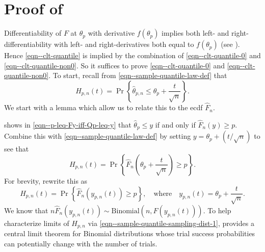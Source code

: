 
\section{Proof of
\texorpdfstring{}{Theorem
\ref{thm--clt-quantile}}}
\label{sec--prf--thm--clt-quantile}

Differentiability of \(F\) at \(\theta_{p}\) with derivative \(f \left(
\theta_{p} \right)\) implies both left- and right-differentiability with left-
and right-derivatives both equal to \(f \left( \theta_{p} \right)\) (see
).
Hence \eqref{eqn--clt-quantile} is
implied by the combination of \eqref{eqn--clt-quantile-0} and
\eqref{eqn--clt-quantile-non0}.
So it suffices to prove \eqref{eqn--clt-quantile-0} and
\eqref{eqn--clt-quantile-non0}.
To start, recall from \eqref{eqn--sample-quantile-law-def} that
\begin{equation*}
  H_{p, n} (t) = \Pr \left\{ \widehat{\theta}_{p, n} \leq \theta_{p} +
  \frac{t}{\sqrt{n}} \right\}.
\end{equation*}
We start with a lemma which allow us to relate this to the ecdf
\(\widehat{F}_{n}\).

 shows in \eqref{eqn--p-leq-Fy-iff-Qp-leq-y}
that \(\widehat{\theta}_{p} \leq y\) if and only if \(\widehat{F}_{n} (y) \geq
p\).
Combine this with \eqref{eqn--sample-quantile-law-def} by setting \(y =
\theta_{p} + (t / \sqrt{n})\) to see that
\begin{equation*}
  H_{p, n} (t) = \Pr \left\{ \widehat{F}_{n} \left( \theta_{p} +
  \frac{t}{\sqrt{n}} \right) \geq p \right\}.
\end{equation*}
For brevity, rewrite this as
\begin{equation}
  H_{p, n} (t) = \Pr \left\{ \widehat{F}_{n} \left( y_{p, n} (t) \right) \geq p
  \right\},
  \quad \text{where} \quad
  y_{p, n} (t) = \theta_{p} + \frac{t}{\sqrt{n}}.
  \label{eqn--sample-quantile-sampling-dist-1}
\end{equation}
We know that \(n \widehat{F}_{n} \left( y_{p, n} (t) \right) \sim
\mathrm{Binomial} \left( n, F \left( y_{p, n} (t) \right) \right)\).
To help characterize limits of \(H_{p, n}\) via
\eqref{eqn--sample-quantile-sampling-dist-1},
 provides a central limit theorem for Binomial
distributions whose trial success probabilities can potentially change with the
number of trials.

